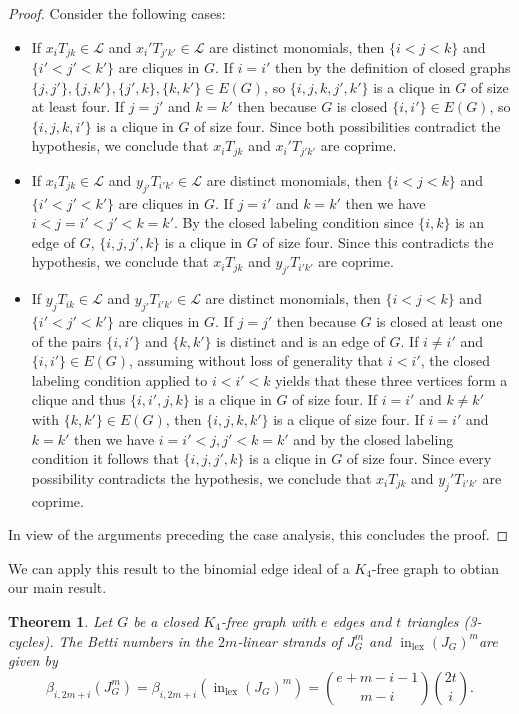 \documentclass[reqno]{amsart}
\newtheorem{thm}{Theorem}[section]
\theoremstyle{definition}
\theoremstyle{remark}
\numberwithin{equation}{section}
\DeclareMathOperator{\init}{in}
\DeclareMathOperator{\lex}{lex}
\begin{document}
\begin{proof}
Consider the following cases:
\begin{itemize}[nosep]
\item[{\em Case 1:}] If $x_iT_{jk} \in \mathcal{L}$ and  $x_i'T_{j'k'} \in \mathcal{L}$ are distinct monomials, then  $\{i<j<k\}$ and  $\{i'<j'<k'\}$ are cliques in $G$. If $i=i'$ then by the definition of closed graphs $\{j,j'\}, \{j,k'\}, \{j',k\}, \{k,k'\}\in E(G)$, so $\{i,j,k,j',k'\}$ is a clique in $G$ of size at least four. If $j=j'$ and $k=k'$ then  because $G$ is closed $\{i,i'\}\in E(G)$, so $\{i,j,k,i'\}$ is a clique in $G$ of size four. Since both possibilities contradict the hypothesis, we conclude that $x_iT_{jk}$ and  $x_i'T_{j'k'}$ are coprime.
\item[{\em Case 2:}] If $x_iT_{jk} \in \mathcal{L}$ and  $y_{j'}T_{i'k'} \in \mathcal{L}$ are distinct monomials, then  $\{i<j<k\}$ and  $\{i'<j'<k'\}$ are cliques in $G$. If $j=i'$ and $k=k'$ then we have $i<j=i'<j'< k=k'$. By the closed labeling condition since $\{i,k\}$ is an edge of $G$, $\{i,j,j',k\}$ is a clique in $G$ of size four.  Since this contradicts the hypothesis, we conclude that $x_iT_{jk}$ and  $y_{j'}T_{i'k'}$ are coprime.
\item[{\em Case 3:}]  If $y_j T_{ik}  \in \mathcal{L}$ and  $y_{j'}T_{i'k'} \in \mathcal{L}$ are distinct monomials, then  $\{i<j<k\}$ and  $\{i'<j'<k'\}$ are cliques in $G$. If $j=j'$ then because $G$ is closed at least one of the pairs $\{i,i'\}$ and $\{k, k'\}$ is distinct and is an edge of $G$. If $i\neq i'$ and $\{i,i'\}\in E(G)$, assuming without loss of generality that $i<i'$, the closed labeling condition applied to $i<i'<k$ yields that these three vertices form a clique and thus $\{i,i',j,k\}$ is a clique in $G$ of size four. If $i=i'$ and $k\neq k'$ with $\{k,k'\}\in E(G)$, then $\{i,j,k,k'\}$ is a clique of size four. 
If $i=i'$ and $k=k'$ then we have $i=i'<j, j'< k=k'$ and by the closed labeling condition it follows that $\{i,j,j',k\}$ is a clique in $G$ of size four. Since every possibility contradicts the hypothesis, we conclude that $x_iT_{jk}$ and  $y_j'T_{i'k'}$ are coprime.
\end{itemize}
In view of the arguments preceding the case analysis, this concludes the proof.
\end{proof}

We can apply this result to the binomial edge ideal of a $K_4$-free graph to obtian our main result.
\begin{thm}\label{thm: linear strand}
    Let $G$ be a closed $K_4$-free graph with $e$ edges and $t$ triangles (3-cycles). The Betti numbers in the $2m$-linear strands of $J_G^m$ and $\init_{\lex}(J_G)^m$are given by
    \[
    \beta_{i, 2m+i}(J_G^m)=\beta_{i, 2m+i}(\init_{\lex}(J_G)^m)=\binom{e+m-i-1}{m-i}\binom{2t}{i}.
    \]
\end{thm}
\end{document}
